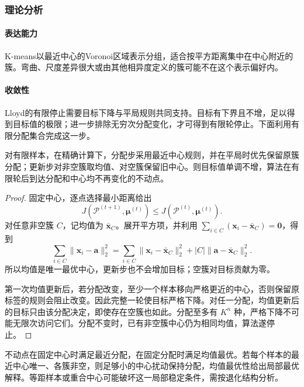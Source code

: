 \subsubsection{理论分析}

\paragraph{表达能力}
K-means以最近中心的Voronoi区域表示分组，适合按平方距离集中在中心附近的簇。弯曲、尺度差异很大或由其他相异度定义的簇可能不在这个表示偏好内。

\paragraph{收敛性}
Lloyd的有限停止需要目标下降与平局规则共同支持。目标有下界且不增，足以得到目标值的极限；进一步排除无穷次分配变化，才可得到有限轮停止。下面利用有限分配集合完成这一步。

\begin{theorem}
  \label{thm:clustering-lloyd}
  对有限样本，在精确计算下，分配步采用最近中心规则，并在平局时优先保留原簇分配；更新步对非空簇取均值、对空簇保留旧中心。则目标值单调不增，算法在有限轮后到达分配和中心均不再变化的不动点。
\end{theorem}
\begin{proof}
固定中心，逐点选择最小距离给出
\[
 J(\mathcal{P}^{(t+1)},\bm{\mu}^{(t)})
 \leq J(\mathcal{P}^{(t)},\bm{\mu}^{(t)}).
\]
对任意非空簇 $C$，记均值为 $\bar{\bm{x}}_C$。展开平方项，并利用 $\sum_{i\in C}(\bm{x}_i-\bar{\bm{x}}_C)=\bm{0}$，得到
\begin{equation}
 \sum_{i\in C}\lVert\bm{x}_i-\bm{a}\rVert_2^2
 =\sum_{i\in C}\lVert\bm{x}_i-\bar{\bm{x}}_C\rVert_2^2
   +|C|\lVert\bm{a}-\bar{\bm{x}}_C\rVert_2^2.
 \label{eq:clustering-mean-decomposition}
\end{equation}
所以均值是唯一最优中心，更新步也不会增加目标；空簇对目标贡献为零。

第一次均值更新后，若分配改变，至少一个样本移向严格更近的中心，否则保留原标签的规则会阻止改变。因此完整一轮使目标严格下降。对任一分配，均值更新后的目标只由该分配决定，即使存在空簇也如此。分配至多有 $K^n$ 种，严格下降不可能无限次访问它们。分配不变时，已有非空簇中心仍为相同均值，算法遂停止。
\end{proof}

不动点在固定中心时满足最近分配，在固定分配时满足均值最优。若每个样本的最近中心唯一、各簇非空，则足够小的中心扰动保持分配，均值最优性给出局部最优解释。等距样本或重合中心可能破坏这一局部稳定条件，需按退化结构分析。

